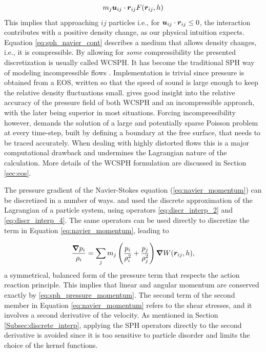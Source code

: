 %
\begin{equation} \label{eq:physical_interp_II}
	m_j\boldsymbol{u}_{ij} \cdot \boldsymbol{r}_{ij}F(\boldsymbol{r}_{ij}, h)
\end{equation}
%
This implies that approaching $ij$ particles i.e., for $\boldsymbol{u}_{ij} \cdot \boldsymbol{r}_{ij} \leq 0$, the interaction contributes with a positive density change, as our physical intuition expects. Equation \eqref{eq:sph_navier_cont} describes a medium that allows density changes, i.e., it is compressible. By allowing for \textit{some} compressibility the presented discretization is usually called \ac{WCSPH}. It has become the traditional \ac{SPH} way of modeling incompressible flows \citep{Monaghan-2005, Lee-2010}. Implementation is trivial since pressure is obtained from a \ac{EOS}, written so that the speed of sound is large enough to keep the relative density fluctuations small. \cite{Lee-2010} gives good insight into the relative accuracy of the pressure field of both \ac{WCSPH} and an incompressible approach, with the later being superior in most situations. Forcing incompressibility however, demands the solution of a large and potentially sparse Poisson problem at every time-step, built by defining a boundary at the free surface, that needs to be traced accurately. When dealing with highly distorted flows this is a major computational drawback and undermines the Lagrangian nature of the calculation. More details of the \ac{WCSPH} formulation are discussed in Section \ref{sec:eos}.

The pressure gradient of the Navier-Stokes equation (\eqref{eq:navier_momentum}) can be discretized in a number of ways. \cite{Gingold-1982} and \cite{Violeau-2012} used the discrete approximation of the Lagrangian of a particle system, using operators \eqref{eq:discr_interp_2} and \eqref{eq:discr_interp_4}. The same operators can be used directly to discretize the term in Equation \eqref{eq:navier_momentum}, leading to

%
 \begin{equation} \label{eq:sph_pressure_momentum}
\frac{\boldsymbol{\nabla}p_i}{\rho_i} = \sum_j{m_j \left( \frac{p_i}{\rho_i^2} +\frac{p_j}{\rho_j^2}\right) \boldsymbol{\nabla} W(\boldsymbol{r}_{ij}, h)},
\end{equation}
%
\noindent a symmetrical, balanced form of the pressure term that respects the action reaction principle. This implies that linear and angular momentum are conserved exactly by \eqref{eq:sph_pressure_momentum}. The second term of the second member in Equation \eqref{eq:navier_momentum} refers to the shear stresses, and it involves a second derivative of the velocity. As mentioned in Section \ref{Subsec:discrete_interp}, applying the SPH operators directly to the second derivative is avoided since it is too sensitive to particle disorder and limits the choice of the kernel functions. 

